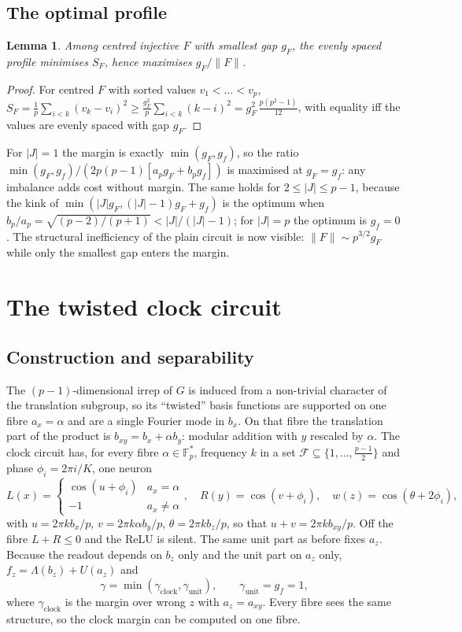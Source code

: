 \documentclass[11pt]{article}
\newtheorem{lemma}{Lemma}
\theoremstyle{remark}
\newcommand{\F}{\mathbb{F}}
\newcommand{\gam}{\gamma}
\newcommand{\abs}[1]{\lvert #1 \rvert}
\newcommand{\norm}[1]{\lVert #1 \rVert}
\begin{document}
\subsection{The optimal profile}

\begin{lemma}
Among centred injective $F$ with smallest gap $g_F$, the evenly spaced profile minimises $S_F$, hence maximises $g_F / \norm{F}$.
\end{lemma}
\begin{proof}
For centred $F$ with sorted values $v_1 < \dots < v_p$, $S_F = \tfrac{1}{p}\sum_{i<k}(v_k - v_i)^2 \ge \tfrac{g_F^2}{p}\sum_{i<k}(k-i)^2
= g_F^2\, \tfrac{p(p^2-1)}{12}$, with equality iff the values are evenly spaced with gap $g_F$.
\end{proof}

For $\abs{J} = 1$ the margin is exactly $\min(g_F, g_f)$, so the ratio $\min(g_F,g_f)/(2p(p-1)[a_p g_F + b_p g_f])$ is maximised at
$g_F = g_f$: any imbalance adds cost without margin. The same holds for $2 \le \abs{J} \le p-1$, because the kink of
$\min(\abs{J} g_F, (\abs{J}-1) g_F + g_f)$ is the optimum when $b_p / a_p = \sqrt{(p-2)/(p+1)} < \abs{J}/(\abs{J}-1)$; for $\abs{J} = p$
the optimum is $g_f = 0$. The structural inefficiency of the plain circuit is now visible: $\norm{F} \sim p^{3/2} g_F$ while only
the smallest gap enters the margin.

\section{The twisted clock circuit}

\subsection{Construction and separability}

The $(p-1)$-dimensional irrep of $G$ is induced from a non-trivial character of the translation subgroup, so its ``twisted'' basis
functions are supported on one fibre $a_x = \alpha$ and are a single Fourier mode in $b_x$. On that fibre the translation part of
the product is $b_{xy} = b_x + \alpha b_y$: modular addition with $y$ rescaled by $\alpha$. The clock circuit has, for every fibre
$\alpha \in \F_p^{*}$, frequency $k$ in a set $\mathcal{F} \subseteq \{1, \dots, \tfrac{p-1}{2}\}$ and phase $\phi_i = 2\pi i / K$,
one neuron
\[
L(x) = \begin{cases} \cos(u + \phi_i) & a_x = \alpha \\ -1 & a_x \ne \alpha \end{cases}, \quad
R(y) = \cos(v + \phi_i), \quad w(z) = \cos(\theta + 2\phi_i),
\]
with $u = 2\pi k b_x / p$, $v = 2\pi k \alpha b_y / p$, $\theta = 2\pi k b_z / p$, so that $u + v = 2\pi k b_{xy}/p$. Off the fibre
$L + R \le 0$ and the ReLU is silent. The same unit part as before fixes $a_z$. Because the readout depends on $b_z$ only and the
unit part on $a_z$ only, $f_z = \Lambda(b_z) + U(a_z)$ and
\[
\gam = \min(\gam_{\mathrm{clock}}, \gam_{\mathrm{unit}}), \qquad \gam_{\mathrm{unit}} = g_f = 1,
\]
where $\gam_{\mathrm{clock}}$ is the margin over wrong $z$ with $a_z = a_{xy}$. Every fibre sees the same structure, so the clock
margin can be computed on one fibre.
\end{document}
